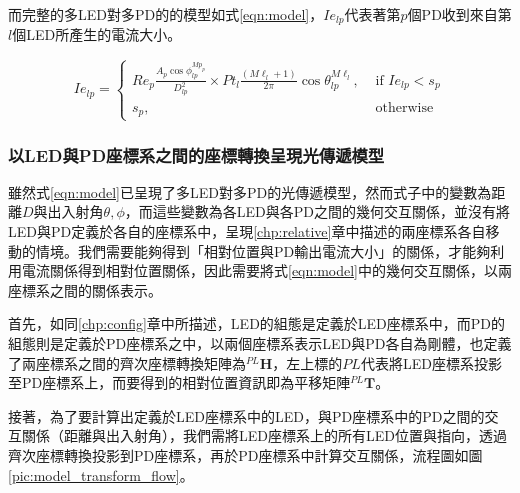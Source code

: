     而完整的多LED對多PD的的模型如式\ref{eqn:model}，$Ie_{lp}$代表著第$p$個PD收到來自第$l$個LED所產生的電流大小。
    
    \begin{equation}
        \label{eqn:model}
        Ie_{lp} = \begin{cases}Re_p \frac{ A_p\cos\phi_{lp}^{Mp_{p}} }{D^2_{lp}}\times Pt_l\frac{(M\ell_{l}+1)}{2 \pi} \cos \theta_{lp}^{M\ell_{l}}, & \text { if } Ie_{lp}<s_p \\ s_p, & \text { otherwise }\end{cases}
    \end{equation}

    




    \subsubsection{以LED與PD座標系之間的座標轉換呈現光傳遞模型}
    \label{chp:model_transform}

    雖然式\ref{eqn:model}已呈現了多LED對多PD的光傳遞模型，然而式子中的變數為距離$D$與出入射角$\theta,\phi$，而這些變數為各LED與各PD之間的幾何交互關係，並沒有將LED與PD定義於各自的座標系中，呈現\ref{chp:relative}章中描述的兩座標系各自移動的情境。我們需要能夠得到「相對位置與PD輸出電流大小」的關係，才能夠利用電流關係得到相對位置關係，因此需要將式\ref{eqn:model}中的幾何交互關係，以兩座標系之間的關係表示。

    首先，如同\ref{chp:config}章中所描述，LED的組態是定義於LED座標系中，而PD的組態則是定義於PD座標系之中，以兩個座標系表示LED與PD各自為剛體，也定義了兩座標系之間的齊次座標轉換矩陣為$^{PL}\boldsymbol{H}$，左上標的$PL$代表將LED座標系投影至PD座標系上，而要得到的相對位置資訊即為平移矩陣$^{PL}\boldsymbol{T}$。

    接著，為了要計算出定義於LED座標系中的LED，與PD座標系中的PD之間的交互關係（距離與出入射角），我們需將LED座標系上的所有LED位置與指向，透過齊次座標轉換投影到PD座標系，再於PD座標系中計算交互關係，流程圖如圖\ref{pic:model_transform_flow}。
    

